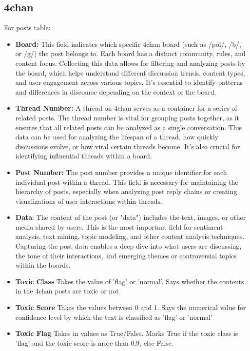 \documentclass[sigconf]{acmart}
\begin{document}
\subsection{4chan}
For posts table:
\begin{itemize}
        \item \textbf{Board:} This field indicates which specific 4chan board (such as /pol/, /b/, or /g/) the post belongs to. Each board has a distinct community, rules, and content focus. Collecting this data allows for filtering and analyzing posts by the board, which helps understand different discussion trends, content types, and user engagement across various topics. It’s essential to identify patterns and differences in discourse depending on the context of the board.

        \item \textbf {Thread Number:} A thread on 4chan serves as a container for a series of related posts. The thread number is vital for grouping posts together, as it ensures that all related posts can be analyzed as a single conversation. This data can be used for analyzing the lifespan of a thread, how quickly discussions evolve, or how viral certain threads become. It's also crucial for identifying influential threads within a board.
        
        \item \textbf {Post Number:} The post number provides a unique identifier for each individual post within a thread. This field is necessary for maintaining the hierarchy of posts, especially when analyzing post reply chains or creating visualizations of user interactions within threads.
        
        \item \textbf {Data}: The content of the post (or "data") includes the text, images, or other media shared by users. This is the most important field for sentiment analysis, text mining, topic modeling, and other content analysis techniques. Capturing the post data enables a deep dive into what users are discussing, the tone of their interactions, and emerging themes or controversial topics within the boards.

        \item \textbf{Toxic Class} Takes the value of 'flag' or 'normal'. Says whether the contents in the 4chan posts are toxic or not

        \item \textbf{Toxic Score} Takes the values between 0 and 1. Says the numerical value for confidence level by which the text is classified as 'flag' or 'normal'

        \item \textbf{Toxic Flag} Takes in values as True/False. Marks True if the toxic class is 'flag' and the toxic score is more than 0.9, else False.
    
    \end{itemize}
\end{document}
